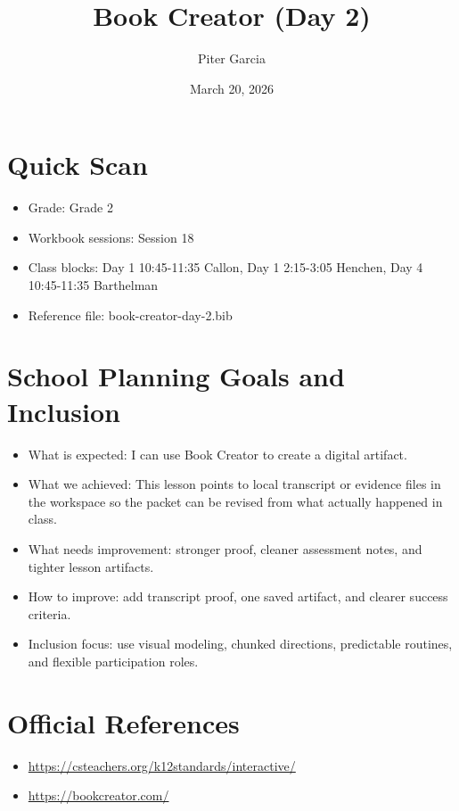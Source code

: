 \documentclass[11pt]{article}
\title{Book Creator (Day 2)}
\author{Piter Garcia}
\date{March 20, 2026}
\begin{document}
    \maketitle
    \section*{Quick Scan}
    \begin{itemize}[leftmargin=*]
    \item Grade: Grade 2
    \item Workbook sessions: Session 18
    \item Class blocks: Day 1 10:45-11:35 Callon, Day 1 2:15-3:05 Henchen, Day 4 10:45-11:35 Barthelman
    \item Reference file: book-creator-day-2.bib
    \end{itemize}
    \section*{School Planning Goals and Inclusion}
    \begin{itemize}[leftmargin=*]
    \item What is expected: I can use Book Creator to create a digital artifact.
    \item What we achieved: This lesson points to local transcript or evidence files in the workspace so the packet can be revised from what actually happened in class.
    \item What needs improvement: stronger proof, cleaner assessment notes, and tighter lesson artifacts.
    \item How to improve: add transcript proof, one saved artifact, and clearer success criteria.
    \item Inclusion focus: use visual modeling, chunked directions, predictable routines, and flexible participation roles.
    \end{itemize}
    \section*{Official References}
    \begin{itemize}[leftmargin=*]
    \item \url{https://csteachers.org/k12standards/interactive/}
\item \url{https://bookcreator.com/}

    \end{itemize}
    
\end{document}
